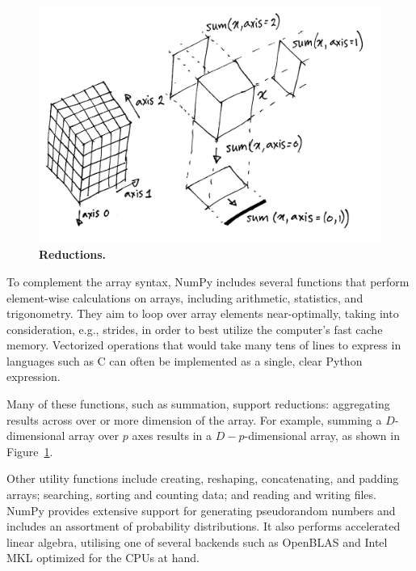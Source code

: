 \begin{figure}
  \centering
  \includegraphics[width=\linewidth]{static/sketches/reductions}
  \caption{\textbf{Reductions.} 
   }
  \label{fig:reductions}
\end{figure}



To complement the array syntax, NumPy includes several functions that perform element-wise calculations on arrays, including arithmetic, statistics, and trigonometry.  They aim to loop over array elements near-optimally, taking into consideration, e.g., strides, in order to best utilize the computer's fast cache memory.  Vectorized operations that would take many tens of lines to express in languages such as C can often be implemented as a single, clear Python expression.

Many of these functions, such as summation, support reductions: aggregating results across over or more dimension of the array.  For example, summing a $D$-dimensional array over $p$ axes results in a $D-p$-dimensional array, as shown in Figure~\ref{fig:reductions}.

Other utility functions include creating, reshaping, concatenating, and padding arrays; searching, sorting and counting data; and reading and writing files.  NumPy provides extensive support for generating pseudorandom numbers and includes an assortment of probability distributions. It also performs accelerated linear algebra, utilising one of several backends such as OpenBLAS and Intel MKL optimized for the CPUs at hand.

